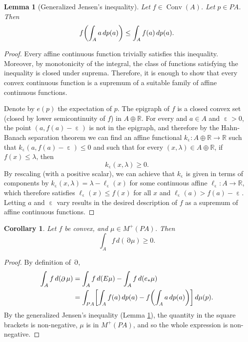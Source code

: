 \documentclass[a4paper,12pt]{scrartcl}
\numberwithin{equation}{section}
\theoremstyle{plain}
\newtheorem{lemma}[thm]{Lemma}
\newtheorem{cor}[thm]{Corollary}
\theoremstyle{definition}
\newcommand{\R}{\mathbb{R}}
\DeclareMathOperator{\1}{\mathbbm{1}}
\DeclareMathOperator{\2}{\mathbbm{2}}
\DeclareMathOperator{\D}{\partial}
\DeclareMathOperator{\e}{\varepsilon}
\let\originalleft\left
\let\originalright\right
\renewcommand{\left}{\mathopen{}\mathclose\bgroup\originalleft}
\renewcommand{\right}{\aftergroup\egroup\originalright}
\begin{document}
\begin{lemma}[Generalized Jensen's inequality]\label{jensen}
 Let $f\in\operatorname{Conv}(A)$. Let $p\in PA$. Then
 \begin{equation}\label{eqjensen}
  f\left( \int_A a\, dp(a) \right) \le \int_A f(a) \, dp(a).
 \end{equation}
\end{lemma}

\begin{proof}
Every affine continuous function trivially satisfies this inequality. Moreover, by monotonicity of the integral, the class of functions satisfying the inequality is closed under suprema. Therefore, it is enough to show that every convex continuous function is a supremum of a suitable family of affine continuous functions.

 Denote by $e(p)$ the expectation of $p$. The epigraph of $f$ is a closed convex set (closed by lower semicontinuity of $f$) in $A\oplus\R$. For every and $a\in A$ and $\e>0$, the point $(a,f(a) - \e)$ is not in the epigraph, and therefore by the Hahn-Banach separation theorem we can find an affine functional $k_{\e} : A \oplus\R \to \R$ such that $k_{\e}(a,f(a) - \e) \leq 0$ and such that for every $(x,\lambda)\in A\oplus\R$, if $f(x) \leq \lambda$, then
\[
	k_{\e}(x,\lambda) \geq 0.
\]
By rescaling (with a positive scalar), we can achieve that $k_{\e}$ is given in terms of components by $k_{\e}(x,\lambda) = \lambda - \ell_{\e}(x)$ for some continuous affine $\ell_{\e} : A\to\R$, which therefore satisfies $\ell_{\e}(x) \leq f(x)$ for all $x$ and $\ell_{\e}(a) > f(a) - \e$. Letting $a$ and $\e$ vary results in the desired description of $f$ as a supremum of affine continuous functions.
\end{proof}



\begin{cor}\label{converse}
 Let $f$ be convex, and $\mu\in M^+(PA)$. Then
 \begin{equation}
  \int_A f\,d(\D\mu) \ge 0. 
 \end{equation}
\end{cor}

\begin{proof}
 By definition of $\D$, 
 \begin{align*}
   \int_A f \, d(\D\mu) &= \int_A f\, d(E\mu) - \int_A f\, d(e_*\mu) \\
    &= \int_{PA} \left[ \int_A f(a) \, dp(a) - f\left( \int_A a\, dp(a) \right) \right] \, d\mu(p) .
  \end{align*}
  By the generalized Jensen's inequality (Lemma \ref{jensen}), the quantity in the square brackets is non-negative, $\mu$ is in $M^+(PA)$, and so the whole expression is non-negative.
\end{proof}
\end{document}
